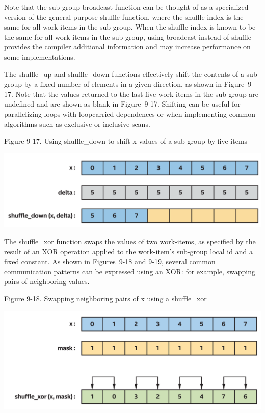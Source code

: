 Note that the sub-group broadcast function can be thought of as a specialized version of the general-purpose shuffle function, where the shuffle index is the same for all work-items in the sub-group. When the shuffle index is known to be the same for all work-items in the sub-group, using broadcast instead of shuffle provides the compiler additional information and may increase performance on some implementations.\par

The shuffle\_up and shuffle\_down functions effectively shift the contents of a sub-group by a fixed number of elements in a given direction, as shown in Figure 9-17. Note that the values returned to the last five work-items in the sub-group are undefined and are shown as blank in Figure 9-17. Shifting can be useful for parallelizing loops with loopcarried dependences or when implementing common algorithms such as exclusive or inclusive scans.\par

\hspace*{\fill} \par %
Figure 9-17. Using shuffle\_down to shift x values of a sub-group by five items
\begin{center}
	\includegraphics[width=1.\textwidth]{content/chapter-9/images/10}
\end{center}

The shuffle\_xor function swaps the values of two work-items, as specified by the result of an XOR operation applied to the work-item's sub-group local id and a fixed constant. As shown in Figures 9-18 and 9-19, several common communication patterns can be expressed using an XOR: for example, swapping pairs of neighboring values.\par

\hspace*{\fill} \par %
Figure 9-18. Swapping neighboring pairs of x using a shuffle\_xor
\begin{center}
	\includegraphics[width=1.\textwidth]{content/chapter-9/images/11}
\end{center}

